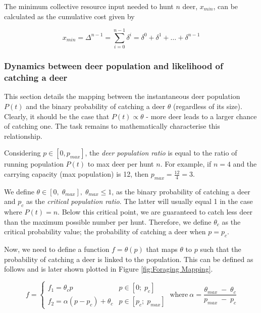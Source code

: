 The minimum collective resource input needed to hunt $n$ deer, $x_{min}$, can be calculated as the cumulative cost given by

\begin{equation}
x_{min} = \Delta^{n-1} = \sum_{i=0}^{n-1}\delta^i = \delta^0 + \delta^1 + \dots + \delta^{n-1}
\end{equation}

\subsubsection{Dynamics between deer population and likelihood of catching a deer}

This section details the mapping between the instantaneous deer population $P(t)$ and the binary probability of catching a deer $\theta$ (regardless of its size). Clearly, it should be the case that $P(t) \propto \theta$ - more deer leads to a larger chance of catching one. The task remains to mathematically characterise this relationship. 

Considering $p \in [0,  p_{max}]$, the \textit{deer population ratio} is equal to the ratio of running population $P(t)$ to max deer per hunt $n$. For example, if $n=4$ and the carrying capacity (max population) is 12, then $p_{max} = \frac{12}{4} = 3$. 

We define $\theta \in [0, \; \theta_{max}], \; \theta_{max} \leq 1 $, as the binary probability of catching a deer and $p_c$ as the \textit{critical population ratio}. The latter will usually equal 1 in the case where $P(t) = n$. Below this critical point, we are guaranteed to catch less deer than the maximum possible number per hunt. Therefore, we define $\theta_c$ as the critical probability value; the probability of catching a deer when $p=p_c$.

Now, we need to define a function $f = \theta(p)$ that maps $\theta$ to $p$ such that the probability of catching a deer is linked to the population. This can be defined as follows and is later shown plotted in Figure \ref{fig:Foraging Mapping}.\newline

\begin{equation}
f=\begin{cases} 
      f_1 = \theta_c p & p \in [0; \; p_c] \\
      f_2 = \alpha(p-p_c) + \theta_c & p \in [p_c; \; p_{max}]
\end{cases}
\ \text{where} \ \alpha = \frac{\theta_{max}\; - \; \theta_c}{p_{max} \; - \; p_c}
\end{equation}
\newline

